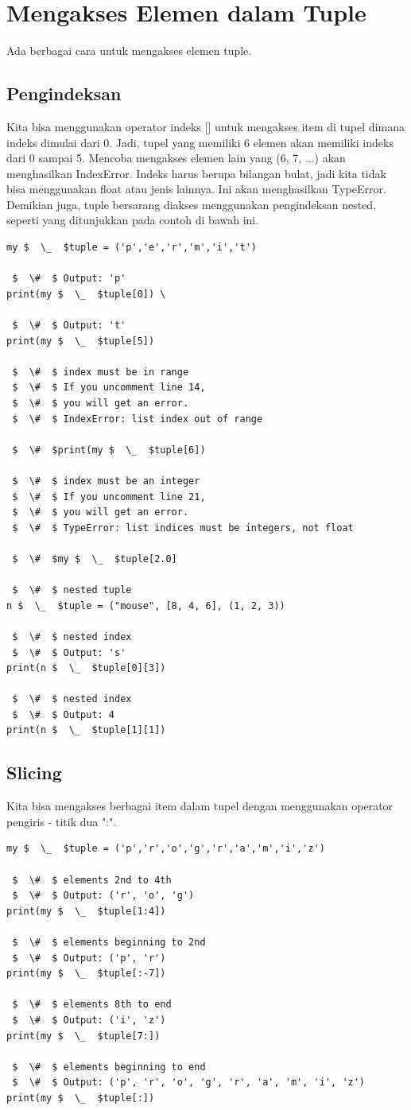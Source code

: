 \section{Mengakses Elemen dalam Tuple} 
Ada berbagai cara untuk mengakses elemen tuple. 
\subsection{Pengindeksan}
Kita bisa menggunakan operator indeks [] untuk mengakses item di tupel dimana indeks dimulai dari 0. Jadi, tupel yang memiliki 6 elemen akan memiliki indeks dari 0 sampai 5. Mencoba mengakses elemen lain yang (6, 7, ...) akan menghasilkan IndexError. Indeks harus berupa bilangan bulat, jadi kita tidak bisa menggunakan float atau jenis lainnya. Ini akan menghasilkan TypeError. Demikian juga, tuple bersarang diakses menggunakan pengindeksan nested, seperti yang ditunjukkan pada contoh di bawah ini. 
\begin{verbatim}
my $  \_  $tuple = ('p','e','r','m','i','t') 

 $  \#  $ Output: 'p' 
print(my $  \_  $tuple[0]) \

 $  \#  $ Output: 't' 
print(my $  \_  $tuple[5]) 

 $  \#  $ index must be in range 
 $  \#  $ If you uncomment line 14, 
 $  \#  $ you will get an error. 
 $  \#  $ IndexError: list index out of range 

 $  \#  $print(my $  \_  $tuple[6]) 

 $  \#  $ index must be an integer 
 $  \#  $ If you uncomment line 21, 
 $  \#  $ you will get an error. 
 $  \#  $ TypeError: list indices must be integers, not float 

 $  \#  $my $  \_  $tuple[2.0] 

 $  \#  $ nested tuple 
n $  \_  $tuple = ("mouse", [8, 4, 6], (1, 2, 3)) 

 $  \#  $ nested index 
 $  \#  $ Output: 's' 
print(n $  \_  $tuple[0][3]) 

 $  \#  $ nested index 
 $  \#  $ Output: 4 
print(n $  \_  $tuple[1][1]) 
\end{verbatim}
\subsection{Slicing} 
Kita bisa mengakses berbagai item dalam tupel dengan menggunakan operator pengiris - titik dua ":". 
\begin{verbatim}
my $  \_  $tuple = ('p','r','o','g','r','a','m','i','z') 

 $  \#  $ elements 2nd to 4th 
 $  \#  $ Output: ('r', 'o', 'g') 
print(my $  \_  $tuple[1:4]) 

 $  \#  $ elements beginning to 2nd 
 $  \#  $ Output: ('p', 'r') 
print(my $  \_  $tuple[:-7]) 

 $  \#  $ elements 8th to end 
 $  \#  $ Output: ('i', 'z') 
print(my $  \_  $tuple[7:]) 

 $  \#  $ elements beginning to end 
 $  \#  $ Output: ('p', 'r', 'o', 'g', 'r', 'a', 'm', 'i', 'z') 
print(my $  \_  $tuple[:]) 
\end{verbatim}
